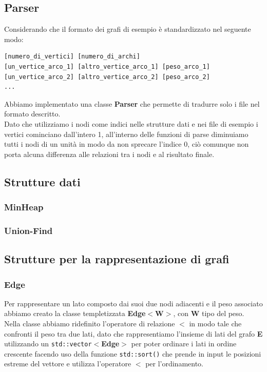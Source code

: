 \documentclass[]{article}
\begin{document}
\subsection{Parser}
Considerando che il formato dei grafi di esempio è standardizzato nel seguente modo:
\begin{verbatim}
[numero_di_vertici] [numero_di_archi] 
[un_vertice_arco_1] [altro_vertice_arco_1] [peso_arco_1] 
[un_vertice_arco_2] [altro_vertice_arco_2] [peso_arco_2] 
...
\end{verbatim}
Abbiamo implementato una classe \textbf{Parser} che permette di tradurre solo i file nel formato descritto.\\
Dato che utilizziamo i nodi come indici nelle strutture dati e nei file di esempio i vertici cominciano dall'intero 1, all'interno delle funzioni di parse diminuiamo tutti i nodi di un unità in modo da non sprecare l'indice 0, ciò comunque non porta alcuna differenza alle relazioni tra i nodi e al risultato finale.
\subsection{Strutture dati}
\subsubsection{MinHeap}
\subsubsection{Union-Find}
\subsection{Strutture per la rappresentazione di grafi}
\subsubsection{Edge}
Per rappresentare un lato composto dai  suoi due nodi adiacenti e il peso associato abbiamo creato la classe templetizzata \textbf{Edge$<$W$>$}, con
\textbf{W} tipo del peso.\\
Nella classe abbiamo ridefinito l'operatore di relazione \textbf{$<$} in modo tale che confronti il peso tra due lati, dato che rappresentiamo l'insieme di lati del grafo \textbf{E} utilizzando un \verb|std::vector|$<$\textbf{Edge}$>$ per poter ordinare i lati in ordine crescente facendo uso della funzione \verb|std::sort()| che prende in input le posizioni estreme del vettore e utilizza l'operatore \textbf{$<$} per l'ordinamento.
\end{document}
